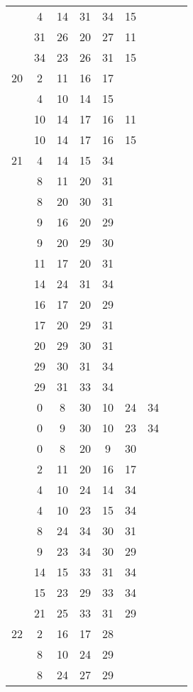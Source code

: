 \begin{table}[H]
\begin{tabular}{|c|cccccccc|}
 & 4 & 14 & 31 & 34 & 15 &   &   &  \\
 & 31 & 26 & 20 & 27 & 11 &   &   &  \\
 & 34 & 23 & 26 & 31 & 15 &   &   &  \\
\hline
20  & 2 & 11 & 16 & 17 &   &   &   &  \\
 & 4 & 10 & 14 & 15 &   &   &   &  \\
 & 10 & 14 & 17 & 16 & 11 &   &   &  \\
 & 10 & 14 & 17 & 16 & 15 &   &   &  \\
\hline
21  & 4 & 14 & 15 & 34 &   &   &   &  \\
 & 8 & 11 & 20 & 31 &   &   &   &  \\
 & 8 & 20 & 30 & 31 &   &   &   &  \\
 & 9 & 16 & 20 & 29 &   &   &   &  \\
 & 9 & 20 & 29 & 30 &   &   &   &  \\
 & 11 & 17 & 20 & 31 &   &   &   &  \\
 & 14 & 24 & 31 & 34 &   &   &   &  \\
 & 16 & 17 & 20 & 29 &   &   &   &  \\
 & 17 & 20 & 29 & 31 &   &   &   &  \\
 & 20 & 29 & 30 & 31 &   &   &   &  \\
 & 29 & 30 & 31 & 34 &   &   &   &  \\
 & 29 & 31 & 33 & 34 &   &   &   &  \\
 & 0 & 8 & 30 & 10 & 24 & 34 &   &  \\
 & 0 & 9 & 30 & 10 & 23 & 34 &   &  \\
 & 0 & 8 & 20 & 9 & 30 &   &   &  \\
 & 2 & 11 & 20 & 16 & 17 &   &   &  \\
 & 4 & 10 & 24 & 14 & 34 &   &   &  \\
 & 4 & 10 & 23 & 15 & 34 &   &   &  \\
 & 8 & 24 & 34 & 30 & 31 &   &   &  \\
 & 9 & 23 & 34 & 30 & 29 &   &   &  \\
 & 14 & 15 & 33 & 31 & 34 &   &   &  \\
 & 15 & 23 & 29 & 33 & 34 &   &   &  \\
 & 21 & 25 & 33 & 31 & 29 &   &   &  \\
\hline
22  & 2 & 16 & 17 & 28 &   &   &   &  \\
 & 8 & 10 & 24 & 29 &   &   &   &  \\
 & 8 & 24 & 27 & 29 &   &   &   &  \\

\end{tabular}
\end{table}
